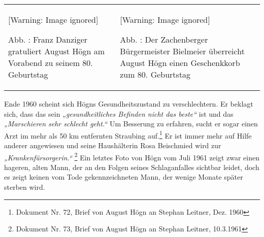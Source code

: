 \documentclass[a4paper]{article}
\newcommand\textstyleZitate[1]{\textit{#1}}
\newcommand\textstyleFootnoteSymbol[1]{\textsuperscript{#1}}
\newcounter{Abb}
\renewcommand\theAbb{\arabic{Abb}}
\begin{document}
\begin{center}
\begin{minipage}{9.146cm}
\begin{center}
\tablefirsthead{}
\tablehead{}
\tabletail{}
\tablelasttail{}
\begin{supertabular}{m{4.309cm}m{4.4370003cm}}
  [Warning: Image ignored] %
 
Abb. \stepcounter{Abb}{\theAbb}: Franz Danziger gratuliert August Högn
am Vorabend zu seinem 80. Geburtstag &
  [Warning: Image ignored] %
 
Abb. \stepcounter{Abb}{\theAbb}: Der Zachenberger Bürgermeister
Bielmeier überreicht August Högn einen Geschenkkorb zum 80.
Geburtstag\\
\end{supertabular}
\end{center}
\end{minipage}
\end{center}
Ende 1960 scheint sich Högns Gesundheitszustand zu verschlechtern. Er
beklagt sich, dass das sein \textstyleZitate{„gesundheitliches Befinden
nicht das beste“} ist und das \textstyleZitate{„Marschieren sehr
schlecht geht.“ }Um Besserung zu erfahren, sucht er sogar einen Arzt im
mehr als 50 km entfernten Straubing auf.\footnote{ Dokument Nr. 72,
Brief von August Högn an Stephan Leitner, Dez. 1960} Er ist immer mehr
auf Hilfe anderer angewiesen und seine Haushälterin Rosa Beischmied
wird zur \textstyleZitate{„Krankenfürsorgerin.“ }\footnote{ Dokument
Nr. 73, Brief von August Högn an Stephan Leitner,
10.3.1961}\textstyleFootnoteSymbol{ }Ein letztes Foto von Högn vom Juli
1961 zeigt zwar einen hageren, alten Mann, der an den Folgen seines
Schlaganfalles sichtbar leidet, doch es zeigt keinen vom Tode
gekennzeichneten Mann, der wenige Monate später sterben wird.
\end{document}
